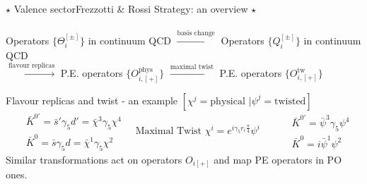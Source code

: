 \documentclass{beamer}
\begin{document}
\begin{frame}[noframenumbering]{$\star$ Valence sector}{Frezzotti \& Rossi Strategy: an overview $\star$}
      \framesubtitle{\hspace*{1pt}}
      \begin{center}
            Operators $\{\Theta_i^{[\pm]}\}$ in continuum QCD $\xrightarrow{ \text{basis change} }$ Operators $\{Q_i^{[\pm]}\}$ in continuum QCD\\
            \vspace{\baselineskip}
            $\xrightarrow{ \text{flavour replicas} }$ P.E. operators $\{O_{i,[+]}^\text{phys}\}$ $\xrightarrow{ \text{maximal twist} }$ P.E. operators $\{O_{i,[+]}^\text{tw}\}$
      \end{center}
      \vspace{\baselineskip}
      Flavour replicas and twist - an example $\left[\chi^j = \text{physical } \big| \psi^j = \text{twisted}\right]$
      \begin{equation*}
            \begin{split}
                  & \bar{K}^{0'}=\bar s' \gamma_5 d' = \bar \chi^3 \gamma_5 \chi^4 \\
                  & \bar{K}^{0} =\bar s\gamma_5 d = \bar \chi^1 \gamma_5 \chi^2
            \end{split}
            \quad \text{Maximal Twist } \chi^i = e^{i\gamma_5 r_i \frac{\pi}{4}}\psi^i \qquad
            \begin{split}
                  & \bar{K}^{0'}=\bar \psi^3 \gamma_5 \psi^4 \\
                  & \bar{K}^{0} = i \bar \psi^1 \psi^2
            \end{split}
      \end{equation*}
      Similar transformations act on operators $O_{i[+]}$ and map PE operators in PO ones.
\end{frame}
\end{document}
